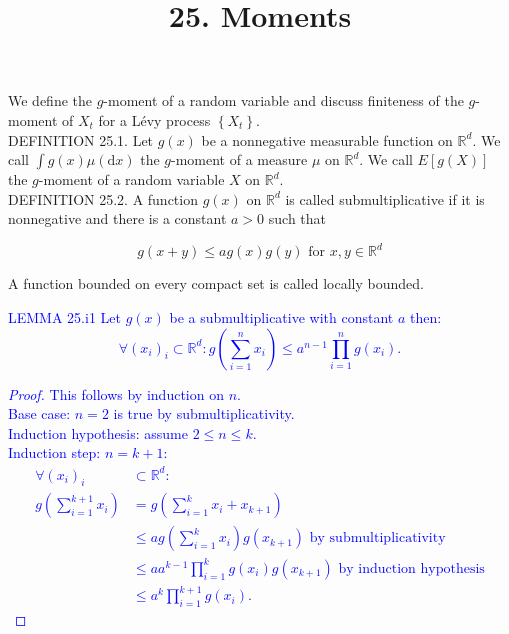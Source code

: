 \documentclass[a4paper,11pt]{article}
\title{25. Moments}
\author{}
\date{}
\begin{document}
\maketitle

We define the $g$-moment of a random variable and discuss finiteness of the $g$-moment of $X_{t}$ for a Lévy process
$\left\{X_{t}\right\}$. \\

DEFINITION 25.1. Let $g(x)$ be a nonnegative measurable function on $\mathbb{R}^{d}$. We call
$\int g(x) \mu(\mathrm{d} x)$ the $g$-moment of a measure $\mu$ on $\mathbb{R}^{d}$. We call $E[g(X)]$ the $g$-moment of
a random variable $X$ on $\mathbb{R}^{d}$. \\

DEFINITION 25.2. A function $g(x)$ on $\mathbb{R}^{d}$ is called submultiplicative if it is nonnegative
and there is a constant $a>0$ such that

\begin{equation*}
    g(x+y) \leq a g(x) g(y) \text { for } x, y \in \mathbb{R}^{d} \tag{25.1}
\end{equation*}

\noindent A function bounded on every compact set is called locally bounded. \\


\textcolor{blue}{
    LEMMA 25.i1 Let $g(x)$ be a submultiplicative with constant $a$ then:
    $$
        \forall (x_{i})_{i} \subset \mathbb{R}^d:
        g\left(\sum_{i=1}^{n} x_{i}\right) \le a^{n-1} \prod_{i=1}^{n} g(x_{i})  .
    $$
    \begin{proof}
        This follows by induction on $n$. \\
        Base case: $n=2$ is true by submultiplicativity. \\
        Induction hypothesis: assume $2 \le  n \le k$. \\
        Induction step: $n=k+1$:
        \begin{align*}
            \forall (x_{i})_{i}                  & \subset \mathbb{R}^d:                                                                          \\
            g\left(\sum_{i=1}^{k+1} x_{i}\right) & = g\left(\sum_{i=1}^{k} x_{i} + x_{k+1}\right)                                                 \\
                                                 & \le a g\left(\sum_{i=1}^{k} x_{i}\right) g(x_{k+1})  \text{ by submultiplicativity}            \\
                                                 & \le a a^{k-1} \prod_{i=1}^{k}  g\left(x_{i}\right) g(x_{k+1})  \text{ by induction hypothesis} \\
                                                 & \le a^{k} \prod_{i=1}^{k+1}  g\left(x_{i}\right) .
        \end{align*}
    \end{proof}
}
\end{document}
